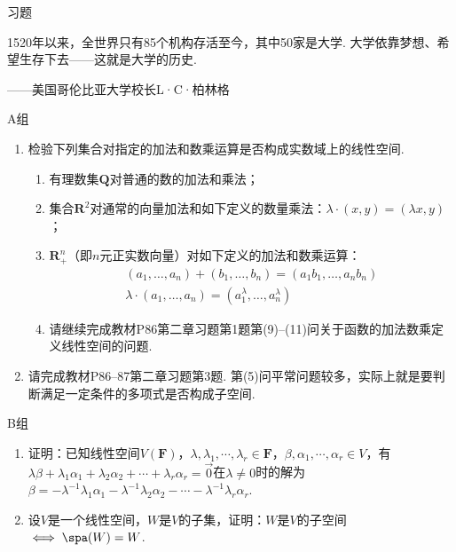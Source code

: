 \vspace{2ex}
\centerline{\heiti \Large 习题}

\vspace{2ex}
{\kaishu 1520年以来，全世界只有85个机构存活至今，其中50家是大学. 大学依靠梦想、希望生存下去——这就是大学的历史.}
\begin{flushright}
    \kaishu
    ——美国哥伦比亚大学校长L·C·柏林格
\end{flushright}

\centerline{\heiti A组}
\begin{enumerate}
    \item 检验下列集合对指定的加法和数乘运算是否构成实数域上的线性空间.
          \begin{enumerate}
              \item 有理数集$\mathbf{Q}$对普通的数的加法和乘法；

              \item 集合$\mathbf{R}^2$对通常的向量加法和如下定义的数量乘法：$\lambda\cdot(x,y)=(\lambda x,y)$；

              \item $\mathbf{R}_+^n$（即$n$元正实数向量）对如下定义的加法和数乘运算：
                    \begin{gather*}
                        (a_1,\ldots,a_n)+(b_1,\ldots,b_n)=(a_1b_1,\ldots,a_nb_n) \\
                        \lambda\cdot(a_1,\ldots,a_n)=(a_1^\lambda,\ldots,a_n^\lambda)
                    \end{gather*}

              \item 请继续完成教材P86第二章习题第1题第(9)--(11)问关于函数的加法数乘定义线性空间的问题.
          \end{enumerate}

    \item 请完成教材P86--87第二章习题第3题. 第(5)问平常问题较多，实际上就是要判断满足一定条件的多项式是否构成子空间.
\end{enumerate}

\centerline{\heiti B组}
\begin{enumerate}
    \item 证明：已知线性空间$V(\mathbf{F})$，$\lambda,\lambda_1,\cdots,\lambda_r\in\mathbf{F}$，$\beta,\alpha_1,\cdots,\alpha_r\in V$，有$\lambda\beta+\lambda_1\alpha_1+\lambda_2\alpha_2+\cdots+\lambda_r\alpha_r=\vec{0}$在$\lambda\neq 0$时的解为$\beta=-\lambda^{-1}\lambda_1\alpha_1-\lambda^{-1}\lambda_2\alpha_2-\cdots-\lambda^{-1}\lambda_r\alpha_r$.

    \item 设$V$是一个线性空间，$W$是$V$的子集，证明：$W$是$V$的子空间$\iff \spa(W)=W$.
\end{enumerate}

